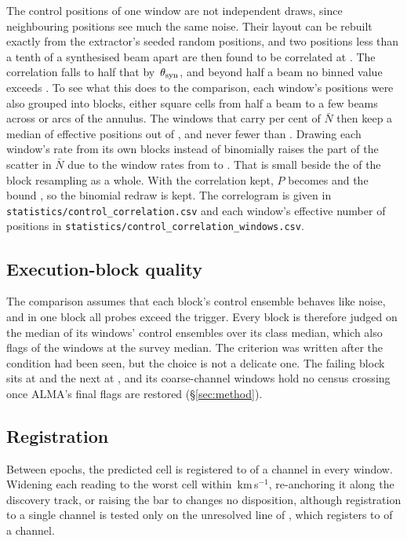 The control positions of one window are not independent draws, since
neighbouring positions see much the same noise. Their layout can be rebuilt
exactly from the extractor's seeded random positions, and two positions
less than a tenth of a synthesised beam apart are then found to be
correlated at \CcRhoNear. The correlation falls to half that by
\CcHalfBeam\,$\theta_{\rm syn}$, and beyond half a beam no binned value
exceeds \CcRhoHalfBeamOut. To see what this does to the comparison, each
window's positions were also grouped into blocks, either square cells from
half a beam to a few beams across or arcs of the annulus. The \CcNLead{}
windows that carry \CcLeadPct{} per cent of $\bar N$ then keep a median of
\CcNeffLeadMed{} effective positions out of \NCtrl, and never fewer than
\CcNeffLeadMin. Drawing each window's rate from its own blocks instead of
binomially raises the part of the scatter in $\bar N$ due to the window
rates from \CcSdBinom{} to \CcSdCorr. That is small beside the \CcSdTotal{}
of the block resampling as a whole. With the correlation kept, $P$ becomes
\CcProbRange{} and the bound \CcAddLimRange, so the binomial redraw is kept. The correlogram is given in
\texttt{statistics/\allowbreak control\_correlation.csv} and each window's
effective number of positions in
\texttt{statistics/\allowbreak control\_correlation\_windows.csv}.

\subsection{Execution-block quality}
\label{sec:blockquality}

The comparison assumes that each block's control ensemble behaves like
noise, and in one block all \NCtrl{} probes exceed the trigger. Every block
is therefore judged on the median of its windows' control ensembles over its
class median, which also flags \DqNWin{} of the \NWindows{} windows at
\BqFactor{} the survey median. The criterion was written after the condition
had been seen, but the choice is not a delicate one. The failing block sits
at \BqFailQ{} and the next at \BqNextQ, and its \BqFailNWin{} coarse-channel
windows hold no census crossing once ALMA's final flags are restored
(\S\ref{sec:method}).

\subsection{Registration}
\label{sec:regbudget}

Between epochs, the predicted cell is registered to \RgBudgetChMed{} of a
channel in every window. Widening each reading to the worst cell within
\RgTolKms\,km\,s$^{-1}$, re-anchoring it along the discovery track, or
raising the bar to \ZtTrialThr{} changes no disposition, although
registration to a single channel is tested only on the unresolved line of
\RgRegStar, which registers to \RgRegMaxCh{} of a channel.


